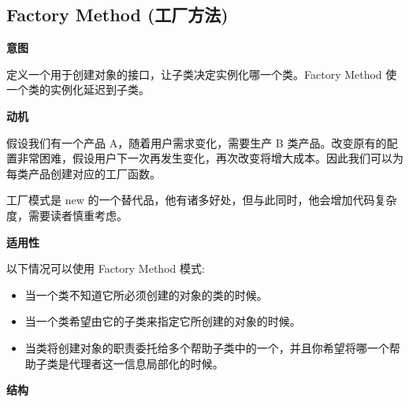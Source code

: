 \subsection{Factory Method (工厂方法)}

\noindent\textbf{意图}

定义一个用于创建对象的接口，让子类决定实例化哪一个类。Factory Method 使一个类的实例化延迟到子类。

\noindent\textbf{动机}

假设我们有一个产品 A，随着用户需求变化，需要生产 B 类产品。改变原有的配置非常困难，假设用户下一次再发生变化，再次改变将增大成本。因此我们可以为每类产品创建对应的工厂函数。

工厂模式是 new 的一个替代品，他有诸多好处，但与此同时，他会增加代码复杂度，需要读者慎重考虑。

\noindent\textbf{适用性}

以下情况可以使用 Factory Method 模式:
\begin{itemize}
    \item 当一个类不知道它所必须创建的对象的类的时候。
    \item 当一个类希望由它的子类来指定它所创建的对象的时候。
    \item 当类将创建对象的职责委托给多个帮助子类中的一个，并且你希望将哪一个帮助子类是代理者这一信息局部化的时候。
\end{itemize}

\noindent\textbf{结构}

\begin{figure}[H]
    \centering
    \scriptsize
\end{figure}

